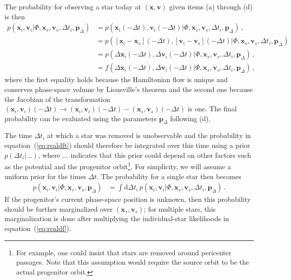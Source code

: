 \documentclass[12pt,preprint]{aastex}
\newcommand{\dd}{\mathrm{d}}
\newcommand{\eqnname}{equation}
\renewcommand{\vec}[1]{\ensuremath{\mathbf{#1}}}
\newcommand{\vecx}{\ensuremath{\vec{x}}}
\newcommand{\vecv}{\ensuremath{\vec{v}}}
\newcommand{\paramsdiff}{\ensuremath{\vec{p}_\Delta}}
\begin{document}
The probability for observing a star today at $(\vecx,\vecv)$ given
items (a) through (d) is then
\begin{align}\label{eq:realdft}
  p(\vecx_i,\vecv_i | \Phi,\vecx_s,\vecv_s,\Delta t_i,\paramsdiff) 
  & = p(\vecx_i(-\Delta t),\vecv_i(-\Delta t) | \Phi,\vecx_s,\vecv_s,\Delta t_i,\paramsdiff) \,,\nonumber\\
  & = p([\vecx_i-\vecx_s](-\Delta t),[\vecv_i-\vecv_s](-\Delta t) | \Phi,\vecx_s,\vecv_s,\Delta t_i,\paramsdiff) \,\nonumber\\
  & = p(\Delta\vecx_i(-\Delta t),\Delta\vecv_i(-\Delta t) | \Phi,\vecx_s,\vecv_s,\Delta t_i,\paramsdiff)\,,\\
  & = f(\Delta\vecx_i(-\Delta t),\Delta\vecv_i(-\Delta t) | \Phi,\vecx_s,\vecv_s,\Delta t_i,\paramsdiff)\, ,\nonumber
\end{align}
where the first equality holds because the Hamiltonian flow is unique
and conserves phase-space volume by Liousville's theorem and the
second one because the Jacobian of the transformation
$(\vecx_i,\vecv_i)(-\Delta t) \rightarrow (\vecx_i,\vecv_i)(-\Delta t)
- (\vecx_s,\vecv_s)(-\Delta t)$ is one. The final probability can be
evaluated using the parameters $\paramsdiff$ following (d).

The time $\Delta t_i$ at which a star was removed is unobservable and
the probability in \eqnname~(\ref{eq:realdft}) should therefore be
integrated over this time using a prior $p(\Delta t_i|\ldots)$, where
$\ldots$ indicates that this prior could depend on other factors such
as the potential and the progenitor orbit\footnote{For example, one
  could insist that stars are removed around pericenter passages. Note
  that this assumption would require the source orbit to be the actual
  progenitor orbit.}. For simplicity, we will assume a uniform prior
for the times $\Delta t$. The probability for a single star then becomes
\begin{align}\label{eq:realdf}
  p(\vecx_i,\vecv_i | \Phi,\vecx_s,\vecv_s,\paramsdiff) & = \int \dd
  \Delta t_i \,p(\vecx_i,\vecv_i | \Phi,\vecx_s,\vecv_s,\Delta t_i,
  \paramsdiff)\,.
\end{align}
If the progenitor's current phase-space position is unknown, then this
probability should be further marginalized over $(\vecx_s,\vecv_s)$;
for multiple stars, this marginalization is done after multiplying the
individual-star likelihoods in \eqnname~(\ref{eq:realdf}).
\end{document}
